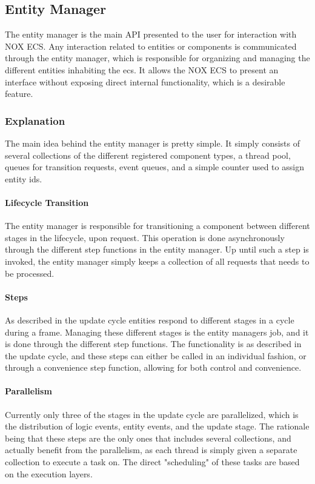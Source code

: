 \subsection{Entity Manager}
\label{subsec:detailed_entity_manager}
The entity manager is the main API presented to the user for interaction with NOX ECS.
Any interaction related to entities or components is communicated through the entity manager,
which is responsible for organizing and managing the different entities inhabiting the ecs.
It allows the NOX ECS to present an interface without exposing direct internal functionality,
which is a desirable feature.

\subsubsection{Explanation}
The main idea behind the entity manager is pretty simple.
It simply consists of several collections of the different registered component types,
a thread pool, queues for transition requests, event queues, and a simple counter
used to assign entity ids.

\paragraph{Lifecycle Transition}
The entity manager is responsible for transitioning a component between different stages
in the lifecycle, upon request.
This operation is done asynchronously through the different step functions in the entity manager.
Up until such a step is invoked, the entity manager simply keeps a collection of all requests that
needs to be processed.

\paragraph{Steps}
As described in the update cycle entities respond to different
stages in a cycle during a frame. Managing these different stages is the entity managers job,
and it is done through the different step functions. The functionality is as described in the update cycle,
and these steps can either be called in an individual fashion, or through a convenience step function,
allowing for both control and convenience.

\paragraph{Parallelism}
Currently only three of the stages in the update cycle are parallelized, which is
the distribution of logic events, entity events, and the update stage.
The rationale being that these steps are the only ones that includes several collections,
and actually benefit from the parallelism, as each thread is simply given a separate collection
to execute a task on.
The direct "scheduling" of these tasks are based on the execution layers.


